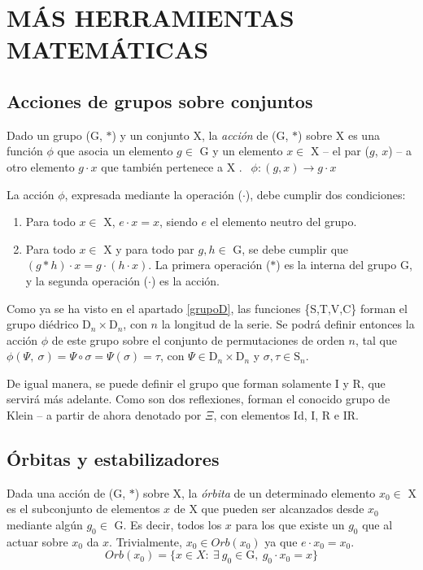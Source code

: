 \chapter{MÁS HERRAMIENTAS MATEMÁTICAS}\label{ch:acciones}
	\section{Acciones de grupos sobre conjuntos}
		Dado un grupo (G, $*$) y un conjunto X, la \emph{acción} de (G, $*$) sobre X es una función $\phi$ que asocia un elemento $g \in$ G y un elemento $x \in$ X -- el par ($g$, $x$) -- a otro elemento $g\cdot x$ que también pertenece a X \cite{armstrong}. $\ \ \phi :(g,x) \to g\cdot x$
	
		La acción $\phi$, expresada mediante la operación ($\cdot$), debe cumplir dos condiciones:
		\begin{enumerate}
			\item{Para todo $x\in$ X, $e\cdot x=x$, siendo $e$ el elemento neutro del grupo.}
		
			\item{Para todo $x\in$ X y para todo par $g,h\in$ G, se debe cumplir que $(g*h)\cdot x=g\cdot (h\cdot x)$. La primera operación ($*$) es la interna del grupo G, y la segunda operación ($\cdot$) es la acción.}
		\end{enumerate}
		Como ya se ha visto en el apartado \ref{grupoD}, las funciones \{S,T,V,C\} forman el grupo diédrico $\text{D}_{n}\times\text{D}_{n}$, con $n$ la longitud de la serie. Se podrá definir entonces la acción $\phi$ de este grupo sobre el conjunto de permutaciones de orden $n$, tal que $\phi(\Psi,\ \sigma)=\Psi\circ\sigma=\Psi(\sigma)=\tau$, con $\Psi\in\text{D}_{n}\times\text{D}_{n}$ y $\sigma,\tau\in\text{S}_n$.
		
		De igual manera, se puede definir el grupo que forman solamente I y R, que servirá más adelante. Como son dos reflexiones, forman el conocido grupo de Klein -- a partir de ahora denotado por $\Xi$, con elementos Id, I, R e IR.

	\section{Órbitas y estabilizadores}	
		Dada una acción de (G, $*$) sobre X, la \emph{órbita} de un determinado elemento $x_0\in$ X es el subconjunto de elementos $x$ de X que pueden ser alcanzados desde $x_0$ mediante algún $g_0\in$ G. Es decir, todos los $x$ para los que existe un $g_0$ que al actuar sobre $x_0$ da $x$. Trivialmente, $x_0\in Orb(x_0)$ ya que $e\cdot x_0=x_0$.
		\[Orb(x_0)=\{x\in X :\ \exists \ g_0\in \text{G},\ g_0\cdot x_0 =x\}\]
	
